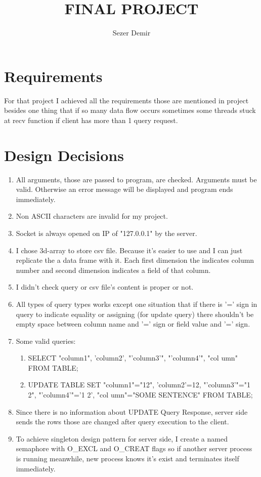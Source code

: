 \documentclass{article}
\title{FINAL PROJECT}
\author{Sezer Demir }
\begin{document}
\maketitle
\section{Requirements}

\setlength{\parindent}{8ex}
\hspace{\parindent} For that project I achieved all the requirements those are mentioned in project besides one thing that if so many data flow occurs sometimes some threads stuck at recv function if client has more than 1 query request.\par
\section{Design Decisions}

\begin{enumerate}[label=\alph*.), leftmargin=1.5\parindent]
  \item All arguments, those are passed to program, are checked. Arguments must be valid. Otherwise an error message will be displayed and program ends immediately. 
  \item Non ASCII characters are invalid for my project.
  \item Socket is always opened on IP of "127.0.0.1" by the server.
  \item I chose 3d-array to store csv file. Because it's easier to use and I can just replicate the a data frame with it. Each first dimension the indicates column number and second dimension indicates a field of that column.  
  \item I didn't check query or csv file's content is proper or not. 
  \item All types of query types works except one situation that if there is '=' sign in query to indicate equality or assigning (for update query) there shouldn't be empty space between column name and '=' sign or field value and '=' sign.
  \item Some valid queries:
        \begin{enumerate}{\arabic}
            \item SELECT "column1", 'column2', "'column3'", "'column4'", "col umn" FROM TABLE;
            \item UPDATE TABLE SET "column1"="12", 'column2'=12, "'column3'"="1 2", "'column4'"='1 2', "col umn"="SOME SENTENCE" FROM TABLE;
        \end{enumerate}
  \item Since there is no information about UPDATE Query Response, server side sends the rows those are changed after query execution to the client. 
  \item To achieve singleton design pattern for server side, I create a named semaphore with O\_EXCL and O\_CREAT flags so if another server process is running meanwhile, new process knows it's exist and terminates itself immediately.  
\end{enumerate}
\end{document}
